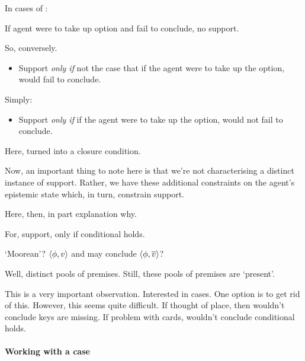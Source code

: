 \begin{note}
  \begin{idea}
    In cases of \zS{}:

    If agent were to take up option and fail to conclude, no support.
  \end{idea}
\end{note}

\begin{note}
  So, conversely.

  \begin{itemize}
  \item
    Support \emph{only if} not the case that if the agent were to take up the option, would fail to conclude.
  \end{itemize}

  Simply:

  \begin{itemize}
  \item
    Support \emph{only if} if the agent were to take up the option, would not fail to conclude.
  \end{itemize}

  Here, turned into a closure condition.
\end{note}

\begin{note}
  Now, an important thing to note here is that we're not characterising a distinct instance of support.
  Rather, we have these additional constraints on the agent's epistemic state which, in turn, constrain support.

  Here, then, in part explanation why.

  For, support, only if conditional holds.
\end{note}


\begin{note}
  `Moorean'?
  \(\langle \phi, v \rangle\) and may conclude \(\langle \phi, \overline{v} \rangle\)?

  Well, distinct pools of premises.
  Still, these pools of premises are `present'.

  This is a very important observation.
  Interested in \zS{} cases.
  One option is to get rid of this.
  However, this seems quite difficult.
  If thought of place, then wouldn't conclude keys are missing.
  If problem with cards, wouldn't conclude conditional holds.
\end{note}

\paragraph*{Working with a case}

